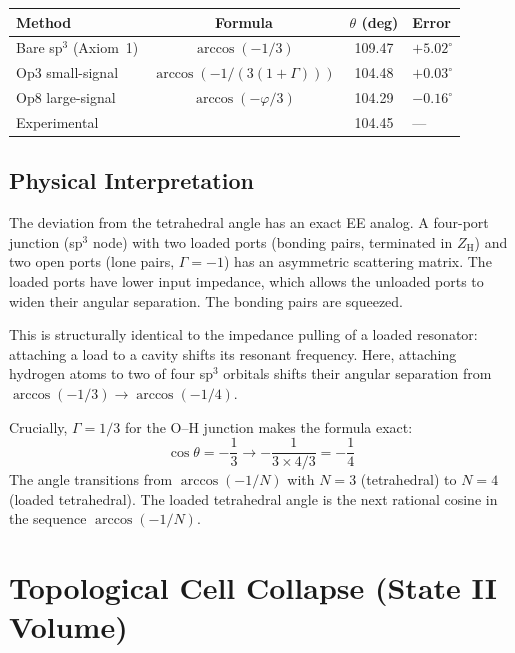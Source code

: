 \begin{center}
\small
\renewcommand{\arraystretch}{1.2}
\begin{tabularx}{\textwidth}{@{}lccX@{}}
\toprule
\textbf{Method} & \textbf{Formula} & \textbf{$\theta$ (deg)} & \textbf{Error} \\
\midrule
Bare sp$^3$ (Axiom~1) & $\arccos(-1/3)$ & 109.47 & $+5.02^{\circ}$ \\
Op3 small-signal & $\arccos(-1/(3(1+\Gamma)))$ & 104.48 & $+0.03^{\circ}$ \\
Op8 large-signal & $\arccos(-\varphi/3)$ & 104.29 & $-0.16^{\circ}$ \\
Experimental & & 104.45 & --- \\
\bottomrule
\end{tabularx}
\end{center}

\subsection{Physical Interpretation}

The deviation from the tetrahedral angle has an exact EE analog. A four-port 
junction (sp$^3$ node) with two loaded ports (bonding pairs, terminated in 
$Z_\text{H}$) and two open ports (lone pairs, $\Gamma = -1$\gammaundeclared{}) has an asymmetric 
scattering matrix. The loaded ports have lower input impedance, which allows the 
unloaded ports to widen their angular separation. The bonding pairs are squeezed.

This is structurally identical to the impedance pulling of a loaded resonator: 
attaching a load to a cavity shifts its resonant frequency. Here, attaching 
hydrogen atoms to two of four sp$^3$ orbitals shifts their angular separation 
from $\arccos(-1/3) \to \arccos(-1/4)$.

Crucially, $\Gamma = 1/3$ for the O--H junction makes the formula exact:
\begin{equation}
  \cos\theta = -\frac{1}{3} \to -\frac{1}{3 \times 4/3} = -\frac{1}{4}
\end{equation}
The angle transitions from $\arccos(-1/N)$ with $N = 3$ (tetrahedral) to 
$N = 4$ (loaded tetrahedral). The loaded tetrahedral angle is the next rational 
cosine in the sequence $\arccos(-1/N)$.


\section{Topological Cell Collapse (State II Volume)}
\label{sec:topological_cell_collapse}

